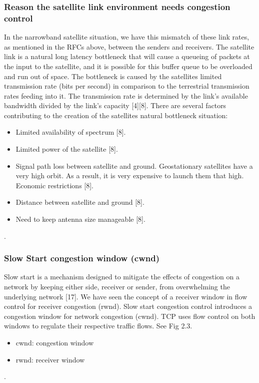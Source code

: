 \documentclass{uathesis}
\begin{document}
\subsubsection*{Reason the satellite link environment needs congestion control}
In the narrowband satellite situation, we have this mismatch of these link rates, as mentioned in the RFCs above, between the senders and receivers. The satellite link is a natural long latency bottleneck that will cause a queueing of packets at the input to the satellite, and it is possible for this buffer queue to be overloaded and run out of space. The bottleneck is caused by the satellites limited transmission rate (bits per second) in comparison to the terrestrial transmission rates feeding into it. The transmission rate is determined by the link's available bandwidth divided by the link's capacity [4][8]. There are several factors contributing to the creation of the satellites natural bottleneck situation:\\

\begin{itemize}
\item Limited availability of spectrum [8].
\item Limited power of the satellite [8].
\item Signal path loss between satellite and ground. Geostationary satellites have a very high orbit. As a result, it is very expensive to launch them that high. Economic restrictions [8].
\item Distance between satellite and ground [8].
\item Need to keep antenna size manageable [8].
\end{itemize}.
\\

\subsubsection*{Slow Start congestion window (cwnd)}
Slow start is a mechanism designed to mitigate the effects of congestion on a network by keeping either side, receiver or sender, from overwhelming the underlying network [17]. We have seen the concept of a receiver window in flow control for receiver congestion (rwnd). Slow start congestion control introduces a congestion window for network congestion (cwnd). TCP uses flow control on both windows to regulate their respective traffic flows. See Fig 2.3. \\

\begin{itemize}
\item cwnd: congestion window
\item rwnd: receiver window
\end{itemize}.
\\
\end{document}
